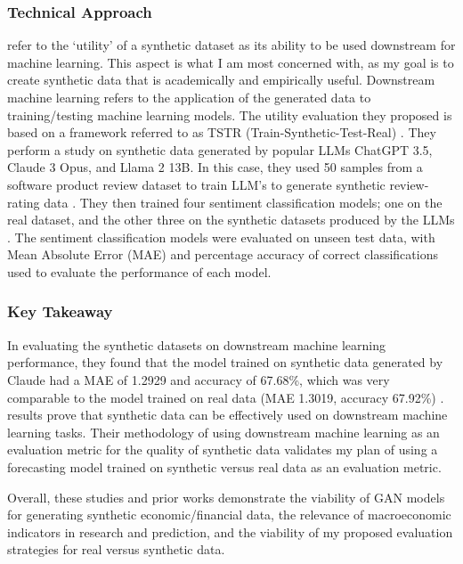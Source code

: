 \documentclass[10pt,twocolumn]{article}
\begin{document}
\subsubsection{Technical Approach}
\textcite{yuan2024multifacetedevaluation} refer to the ‘utility’ of a synthetic dataset as its ability to be used downstream for machine learning. This aspect is what I am most concerned with, as my goal is to create synthetic data that is academically and empirically useful. Downstream machine learning refers to the application of the generated data to training/testing machine learning models. The utility evaluation they proposed is based on a framework referred to as TSTR (Train-Synthetic-Test-Real) \cite{yuan2024multifacetedevaluation}. They perform a study on synthetic data generated by popular LLMs ChatGPT 3.5, Claude 3 Opus, and Llama 2 13B. In this case, they used 50 samples from a software product review dataset to train LLM’s to generate synthetic review-rating data \cite{yuan2024multifacetedevaluation}. They then trained four sentiment classification models; one on the real dataset, and the other three on the synthetic datasets produced by the LLMs \cite{yuan2024multifacetedevaluation}. The sentiment classification models were evaluated on unseen test data, with Mean Absolute Error (MAE) and percentage accuracy of correct classifications used to evaluate the performance of each model. 

\subsubsection{Key Takeaway}
In evaluating the synthetic datasets on downstream machine learning performance, they found that the model trained on synthetic data generated by Claude had a MAE of 1.2929 and accuracy of 67.68\%, which was very comparable to the model trained on real data (MAE 1.3019, accuracy 67.92\%) \cite{yuan2024multifacetedevaluation}.\textcite{yuan2024multifacetedevaluation} results prove that synthetic data can be effectively used on downstream machine learning tasks. Their methodology of using downstream machine learning as an evaluation metric for the quality of synthetic data validates my plan of using a forecasting model trained on synthetic versus real data as an evaluation metric. 

Overall, these studies and prior works demonstrate the viability of GAN models for generating synthetic economic/financial data, the relevance of macroeconomic indicators in research and prediction, and the viability of my proposed evaluation strategies for real versus synthetic data.
\end{document}
